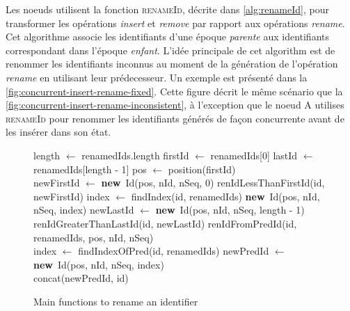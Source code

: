 \documentclass[12pt]{thesul}
\newcommand{\new}{\textbf{new}}
\begin{document}
Les noeuds utilisent la fonction \textsc{renameId}, décrite dans \autoref{alg:renameId}, pour transformer les opérations \emph{insert} et \emph{remove} par rapport aux opérations \emph{rename}.
Cet algorithme associe les identifiants d'une époque \emph{parente} aux identifiants correspondant dans l'époque \emph{enfant}.
L'idée principale de cet algorithm est de renommer les identifiants inconnus au moment de la génération de l'opération \emph{rename} en utilisant leur prédecesseur.
Un exemple est présenté dans la \autoref{fig:concurrent-insert-rename-fixed}.
Cette figure décrit le même scénario que la \autoref{fig:concurrent-insert-rename-inconsistent}, à l'exception que le noeud A utilises \textsc{renameId} pour renommer les identifiants générés de façon concurrente avant de les insérer dans son état.

\begin{figure}[!ht]
  \footnotesize
  \begin{algorithmic}
          \State length $\gets$ renamedIds.length
          \State firstId $\gets$ renamedIds[0]
          \State lastId $\gets$ renamedIds[length - 1]
          \State pos $\gets$ position(firstId)
          \\
              \State newFirstId $\gets$ \new~Id(pos, nId, nSeq, 0)
              \State \Return renIdLessThanFirstId(id, newFirstId)
              \State index $\gets$ findIndex(id, renamedIds)
              \State \Return \new~Id(pos, nId, nSeq, index)
              \State newLastId $\gets$ \new~Id(pos, nId, nSeq, length - 1)
              \State \Return renIdGreaterThanLastId(id, newLastId)
          \Else
              \State \Return renIdFromPredId(id, renamedIds, pos, nId, nSeq)
          \EndIf
      \EndFunction
      \\
          \State index $\gets$ findIndexOfPred(id, renamedIds)
          \State newPredId $\gets$ \new~Id(pos, nId, nSeq, index)
          \\
          \State \Return concat(newPredId, id)
      \EndFunction
  \end{algorithmic}
  \caption{Main functions to rename an identifier}
  \label{alg:renameId}
\end{figure}
\end{document}
